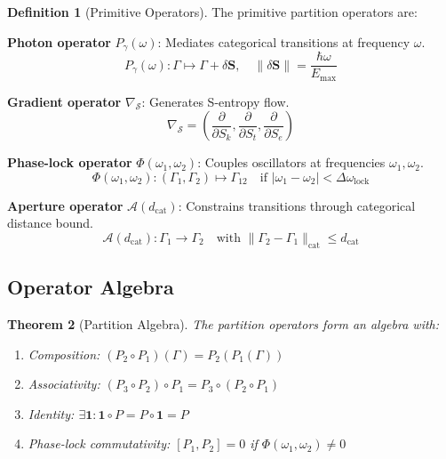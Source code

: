 \documentclass[10pt,twocolumn]{article}
\theoremstyle{plain}
\newtheorem{theorem}{Theorem}[section]
\theoremstyle{definition}
\newtheorem{definition}[theorem]{Definition}
\theoremstyle{remark}
\newcommand{\Sspace}{\mathcal{S}}
\newcommand{\Sk}{S_k}
\newcommand{\St}{S_t}
\newcommand{\Se}{S_e}
\newcommand{\Scoord}{\mathbf{S}}
\newcommand{\Gstate}{\Gamma}
\newcommand{\dcat}{d_{\mathrm{cat}}}
\newcommand{\Pop}{P}
\newcommand{\omegalock}{\Delta\omega_{\mathrm{lock}}}
\begin{document}
\begin{definition}[Primitive Operators]
\label{def:primitives}
The primitive partition operators are:

\textbf{Photon operator} $\Pop_\gamma(\omega)$: Mediates categorical transitions at frequency $\omega$.
\begin{equation}
\Pop_\gamma(\omega): \Gstate \mapsto \Gstate + \delta\Scoord, \quad \|\delta\Scoord\| = \frac{\hbar\omega}{E_{\max}}
\end{equation}

\textbf{Gradient operator} $\nabla_{\Sspace}$: Generates S-entropy flow.
\begin{equation}
\nabla_{\Sspace} = \left(\frac{\partial}{\partial \Sk}, \frac{\partial}{\partial \St}, \frac{\partial}{\partial \Se}\right)
\end{equation}

\textbf{Phase-lock operator} $\Phi(\omega_1, \omega_2)$: Couples oscillators at frequencies $\omega_1, \omega_2$.
\begin{equation}
\Phi(\omega_1, \omega_2): (\Gstate_1, \Gstate_2) \mapsto \Gstate_{12} \quad \text{if } |\omega_1 - \omega_2| < \omegalock
\end{equation}

\textbf{Aperture operator} $\mathcal{A}(\dcat)$: Constrains transitions through categorical distance bound.
\begin{equation}
\mathcal{A}(\dcat): \Gstate_1 \to \Gstate_2 \quad \text{with } \|\Gstate_2 - \Gstate_1\|_{\mathrm{cat}} \leq \dcat
\end{equation}
\end{definition}

\subsection{Operator Algebra}

\begin{theorem}[Partition Algebra]
\label{thm:algebra}
The partition operators form an algebra with:
\begin{enumerate}[label=(\roman*)]
\item \emph{Composition}: $(\Pop_2 \circ \Pop_1)(\Gstate) = \Pop_2(\Pop_1(\Gstate))$
\item \emph{Associativity}: $(\Pop_3 \circ \Pop_2) \circ \Pop_1 = \Pop_3 \circ (\Pop_2 \circ \Pop_1)$
\item \emph{Identity}: $\exists \mathbf{1}: \mathbf{1} \circ \Pop = \Pop \circ \mathbf{1} = \Pop$
\item \emph{Phase-lock commutativity}: $[\Pop_1, \Pop_2] = 0$ if $\Phi(\omega_1, \omega_2) \neq 0$
\end{enumerate}
\end{theorem}
\end{document}
